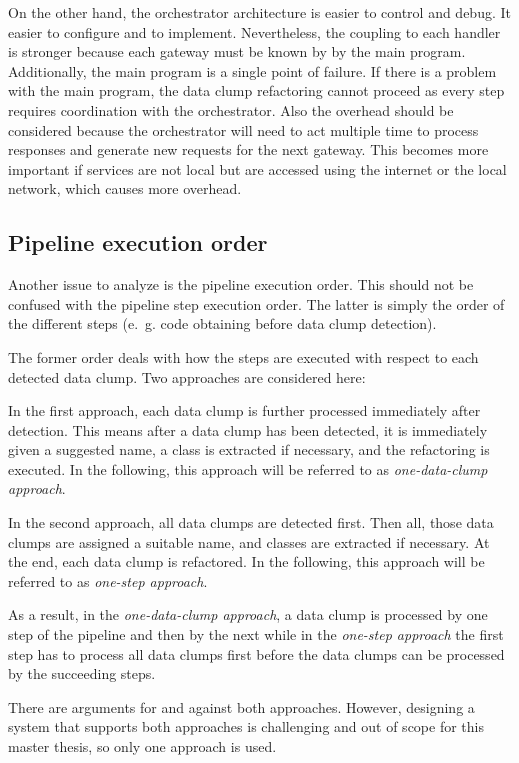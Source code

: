 On the other hand, the orchestrator architecture is easier to control and debug. It easier to configure and to implement. Nevertheless, the coupling to each handler is stronger because each gateway must be known by by the main program. Additionally, the main program is a single point of failure. If there is a problem with the main program, the data clump refactoring cannot proceed as every step requires coordination with the orchestrator. Also the overhead should be considered because the orchestrator will need to act multiple time to process responses and generate new requests for the next gateway. This becomes more important if services are not local but are accessed using the internet or the local network, which causes more overhead. \cite{orchestration_choreography}


\subsection{Pipeline execution order}\label{sec:pipeline_exec_order}

Another issue to analyze is the pipeline execution order. This should not be confused with the pipeline step execution order. The latter is simply the order of the different steps (e.~g. code obtaining before data clump detection). 

The former order deals with how the steps are executed with respect to each detected data clump. Two approaches are considered here:

In the first approach, each data clump is  further processed immediately after detection. This means after a data clump has been detected, it is immediately given a suggested name, a class is extracted if necessary, and the refactoring is executed. In the following, this approach will be referred to as \textit{one-data-clump approach}.

In the second approach, all data clumps are detected first. Then all, those data clumps are assigned a suitable name, and classes are extracted if necessary. At the end, each data clump is refactored. In the following, this approach will be referred to as \textit{one-step approach}.

As a result, in the \textit{one-data-clump approach}, a data clump is processed by one step of the pipeline and then by the next while in the \textit{one-step approach} the first step has to process all data clumps first before the data clumps can be processed by the succeeding steps.

There are arguments for and against both approaches. However, designing a system that supports both approaches is challenging and out of scope for this master thesis, so only one approach is used. 

